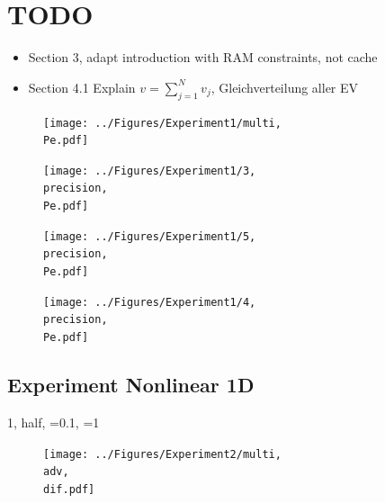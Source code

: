 \documentclass{scrartcl}
\begin{document}
	\section{TODO}

	\begin{itemize}
		\item Section 3, adapt introduction with RAM constraints, not cache
		\item Section 4.1 Explain $v=\sum_{j=1}^N v_j$, Gleichverteilung aller EV		
	\end{itemize}
	
	
	\begin{figure}[H]
		\centering
		\texttt{[image: ../Figures/Experiment1/multi, \\Pe.pdf]}
	\end{figure}
	
	\begin{figure}[H]
		\centering
		\texttt{[image: ../Figures/Experiment1/3, \\precision, \\Pe.pdf]}
	\end{figure}
	
	\begin{figure}[H]
		\centering
		\texttt{[image: ../Figures/Experiment1/5, \\precision, \\Pe.pdf]}
	\end{figure}
	
	\begin{figure}[H]
		\centering
		\texttt{[image: ../Figures/Experiment1/4, \\precision, \\Pe.pdf]}
	\end{figure}
	
	
	\newpage
	\subsection{Experiment Nonlinear 1D}
	\newcommand{\adv}{\detokenize{α}=0.1}
	\newcommand{\dif}{=1}
	\renewcommand{\precision}{half}
	{1, \precision, \adv, \dif}
	\begin{figure}[H]
		\centering
		\texttt{[image: ../Figures/Experiment2/multi, \\adv, \\dif.pdf]}
	\end{figure}
	
\end{document}
